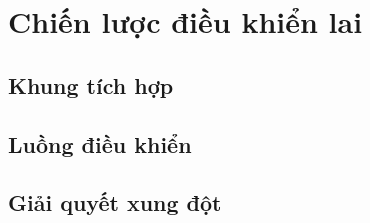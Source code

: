 \chapter{Chiến lược điều khiển lai}
\section{Khung tích hợp}
\section{Luồng điều khiển}
\section{Giải quyết xung đột}